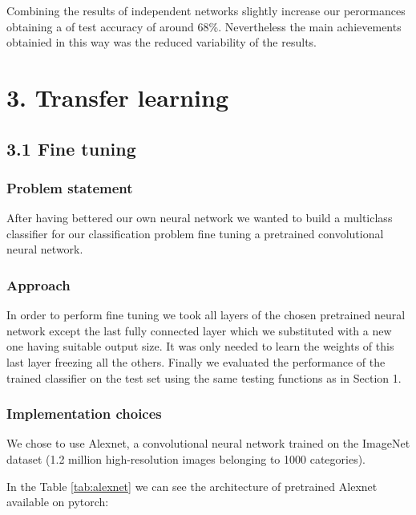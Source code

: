 \documentclass[12pt, a4paper]{report}
\begin{document}
Combining the results of independent networks slightly increase our perormances obtaining a of test accuracy of around 68\%. Nevertheless the main achievements obtainied in this way was the reduced variability of the results. 

\section*{3. Transfer learning}
\subsection*{3.1 Fine tuning}
\subsubsection*{Problem statement}

After having bettered our own neural network we wanted to build a multiclass classifier for our classification problem fine tuning a pretrained convolutional neural network.

\subsubsection*{Approach}
In order to perform fine tuning we took all layers of the chosen pretrained neural network except the last fully connected layer which we substituted with a new one having suitable output size. It was only needed to learn the weights of this last layer freezing all the others. Finally we evaluated the performance of the trained classifier on the test set using the same testing functions as in Section 1.

\subsubsection*{Implementation choices}
We chose to use Alexnet, a convolutional neural network trained on the ImageNet dataset (1.2 million high-resolution images belonging to 1000 categories).

In the Table \ref{tab:alexnet} we can see the architecture of pretrained Alexnet available on pytorch:
\end{document}
